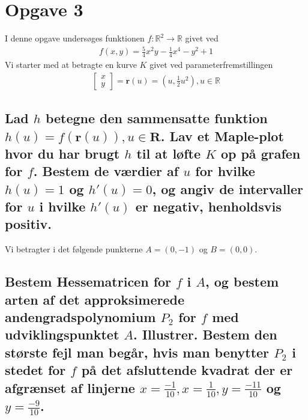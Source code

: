 \section{Opgave 3}
I denne opgave undersøges funktionen $f:\mathbb{R}^2 \rightarrow \mathbb{R}$ givet ved
\begin{align*}
f(x,y) = \frac{5}{4} x^2 y-\frac14 x^4 -y^2+1
\end{align*}
Vi starter med at betragte en kurve $K$ givet ved parameterfremstillingen
\begin{align}
\left[
    \begin{array}{c}
        x\\y
    \end{array}
\right] 
= \textbf{r}(u) = \left(u,\frac12 u^2 \right), u\in \mathbb{R}
\end{align}
\subsection{Lad $h$ betegne den sammensatte funktion $h(u)=f(\textbf{r}(u)),u\in \textbf{R}$. Lav et Maple-plot hvor du har brugt $h$ til at løfte $K$ op på grafen for $f$. Bestem de værdier af $u$ for hvilke $h(u)=1$ og $h'(u)=0$, og angiv de intervaller for $u$ i hvilke $h'(u)$ er negativ, henholdsvis positiv.}



Vi betragter i det følgende punkterne $A = (0,-1)$ og $B=(0,0)$.

\subsection{Bestem Hessematricen for $f$ i $A$, og bestem arten af det approksimerede andengradspolynomium $P_2$ for $f$ med udviklingspunktet $A$. Illustrer. Bestem den største fejl man begår, hvis man benytter $P_2$ i stedet for $f$ på det afsluttende kvadrat der er afgrænset af linjerne $x=\frac{-1}{10},x=\frac{1}{10},y=\frac{-11}{10}$ og $y=\frac{-9}{10}$.}

